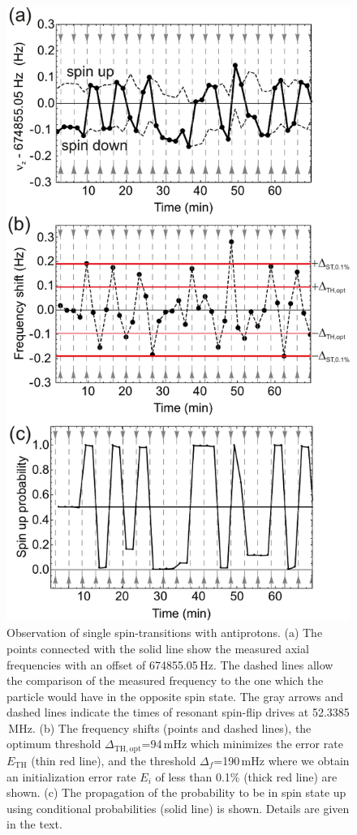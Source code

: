 \documentclass[12pt,preprint%
]{elsarticle}
\begin{document}
\begin{figure}[p]
\centerline{\includegraphics[width=0.45 \textwidth,keepaspectratio]{FIG4SSF.pdf}}
\caption[Filter]{Observation of single spin-transitions with antiprotons. (a) The points connected with the solid line show the measured axial frequencies with an offset of 674855.05$\,$Hz. The dashed lines allow the comparison of the measured frequency to the one which the particle would have in the opposite spin state. The gray arrows and dashed lines indicate the times of resonant spin-flip drives at 52.3385$\,$MHz. (b) The frequency shifts (points and dashed lines), the optimum threshold $\Delta_{\mathrm{TH,opt}}$=94$\,$mHz which minimizes the error rate $E_{\mathrm{TH}}$ (thin red line), and the threshold $\Delta_{f}$=190$\,$mHz where we obtain an initialization error rate $E_{i}$ of less than 0.1$\%$ (thick red line) are shown. (c) The propagation of the probability to be in spin state up using conditional probabilities (solid line) is shown. Details are given in the text.} 
\label{fig5}
\end{figure}
\end{document}

